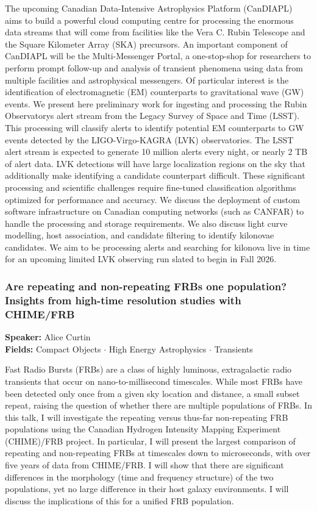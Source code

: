 The upcoming Canadian Data-Intensive Astrophysics Platform (CanDIAPL) aims to build a powerful cloud computing centre for processing the enormous data streams that will come from facilities like the Vera C. Rubin Telescope and the Square Kilometer Array (SKA) precursors. An important component of CanDIAPL will be the Multi-Messenger Portal, a one-stop-shop for researchers to perform prompt follow-up and analysis of transient phenomena using data from multiple facilities and astrophysical messengers. Of particular interest is the identification of electromagnetic (EM) counterparts to gravitational wave (GW) events. We present here preliminary work for ingesting and processing the Rubin Observatorys alert stream from the Legacy Survey of Space and Time (LSST). This processing will classify alerts to identify potential EM counterparts to GW events detected by the LIGO-Virgo-KAGRA (LVK) observatories. The LSST alert stream is expected to generate 10 million alerts every night, or nearly 2 TB of alert data. LVK detections will have large localization regions on the sky that additionally make identifying a candidate counterpart difficult. These significant processing and scientific challenges require fine-tuned classification algorithms optimized for performance and accuracy. We discuss the deployment of custom software infrastructure on Canadian computing networks (such as CANFAR) to handle the processing and storage requirements. We also discuss light curve modelling, host association, and candidate filtering to identify kilonovae candidates. We aim to be processing alerts and searching for kilonova live in time for an upcoming limited LVK observing run slated to begin in Fall 2026.

\hypertarget{abstract-talk-134}{}\label{abstract-page-talk-134}
\subsubsection*{Are repeating and non-repeating FRBs one population? Insights from high-time resolution studies with CHIME/FRB}
\textbf{Speaker:} Alice Curtin\\
\textbf{Fields:} Compact Objects $\cdot$ High Energy Astrophysics $\cdot$ Transients

Fast Radio Bursts (FRBs) are a class of highly luminous, extragalactic radio transients that occur on nano-to-millisecond timescales. While most FRBs have been detected only once from a given sky location and distance, a small subset repeat, raising the question of whether there are multiple populations of FRBs. In this talk, I will investigate the repeating versus thus-far non-repeating FRB populations using the Canadian Hydrogen Intensity Mapping Experiment (CHIME)/FRB project. In particular, I will present the largest comparison of repeating and non-repeating FRBs at timescales down to microseconds, with over five years of data from CHIME/FRB. I will show that there are significant differences in the morphology (time and frequency structure) of the two populations, yet no large difference in their host galaxy environments. I will discuss the implications of this for a unified FRB population.

